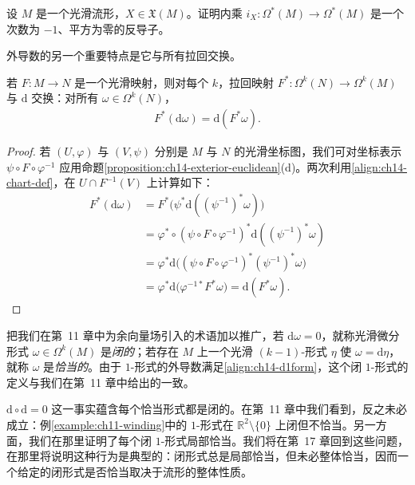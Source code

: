 \documentclass[../../main.tex]{subfiles}
\begin{document}
\begin{exercise}\label{exercise:ch14-25}
设 $M$ 是一个光滑流形，$X\in\mathfrak X(M)$。证明内乘 $i_X:\Omega^*(M)\to\Omega^*(M)$ 是一个次数为 $-1$、平方为零的反导子。
\end{exercise}

外导数的另一个重要特点是它与所有拉回交换。

\begin{proposition}[外导数的自然性]\label{proposition:ch14-exterior-naturality}
若 $F:M\to N$ 是一个光滑映射，则对每个 $k$，拉回映射 $F^*:\Omega^k(N)\to\Omega^k(M)$ 与 $\mathrm{d}$ 交换：对所有 $\omega\in\Omega^k(N)$，
\begin{align}
F^*(\mathrm{d}\omega)=\mathrm{d}(F^*\omega).\label{align:ch14-naturality}
\end{align}
\end{proposition}

\begin{proof}
若 $(U,\varphi)$ 与 $(V,\psi)$ 分别是 $M$ 与 $N$ 的光滑坐标图，我们可对坐标表示 $\psi\circ F\circ\varphi^{-1}$ 应用命题\ref{proposition:ch14-exterior-euclidean}(d)。两次利用\eqref{align:ch14-chart-def}，在 $U\cap F^{-1}(V)$ 上计算如下：
\begin{align*}
F^*(\mathrm{d}\omega)
&=F^*\bigl(\psi^*\mathrm{d}((\psi^{-1})^*\omega)\bigr)\\
&=\varphi^*\circ(\psi\circ F\circ\varphi^{-1})^*\mathrm{d}((\psi^{-1})^*\omega)\\
&=\varphi^*\mathrm{d}\bigl((\psi\circ F\circ\varphi^{-1})^*(\psi^{-1})^*\omega\bigr)\\
&=\varphi^*\mathrm{d}\bigl(\varphi^{-1*}F^*\omega\bigr)=\mathrm{d}(F^*\omega).
\end{align*}
\end{proof}

把我们在第~11 章中为余向量场引入的术语加以推广，若 $\mathrm{d}\omega=0$，就称光滑微分形式 $\omega\in\Omega^k(M)$ 是\emph{闭的}；若存在 $M$ 上一个光滑 $(k-1)$-形式 $\eta$ 使 $\omega=\mathrm{d}\eta$，就称 $\omega$ 是\emph{恰当的}。由于 $1$-形式的外导数满足\eqref{align:ch14-d1form}，这个闭 $1$-形式的定义与我们在第~11 章中给出的一致。

$\mathrm{d}\circ\mathrm{d}=0$ 这一事实蕴含每个恰当形式都是闭的。在第~11 章中我们看到，反之未必成立：例\ref{example:ch11-winding}中的 $1$-形式在 $\mathbb{R}^2\setminus\{0\}$ 上闭但不恰当。另一方面，我们在那里证明了每个闭 $1$-形式局部恰当。我们将在第~17 章回到这些问题，在那里将说明这种行为是典型的：闭形式总是局部恰当，但未必整体恰当，因而一个给定的闭形式是否恰当取决于流形的整体性质。
\end{document}
